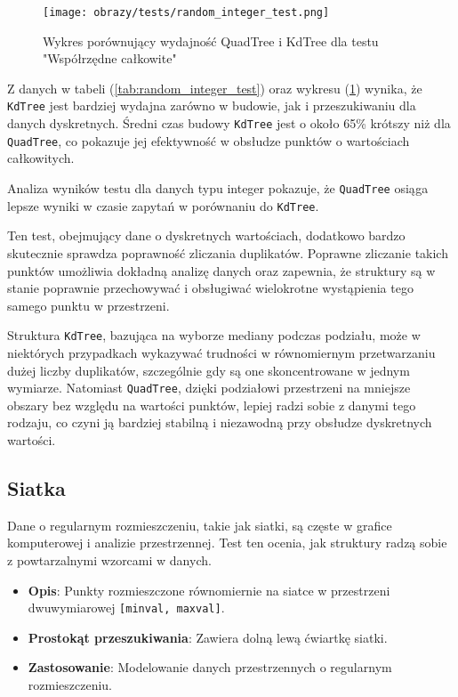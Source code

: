 \documentclass[12pt]{article}
\begin{document}
\begin{figure}[h]
    \centering
    \texttt{[image: obrazy/tests/random\_integer\_test.png]}
    \caption{Wykres porównujący wydajność QuadTree i KdTree dla testu "Współrzędne całkowite"}
    \label{fig:random_integer_tests}
\end{figure}

\newpage
\noindent Z danych w tabeli (\ref{tab:random_integer_test}) oraz wykresu (\ref{fig:random_integer_tests}) wynika, że \texttt{KdTree} jest bardziej wydajna zarówno w budowie, jak i przeszukiwaniu dla danych dyskretnych. Średni czas budowy \texttt{KdTree} jest o około 65\% krótszy niż dla \texttt{QuadTree}, co pokazuje jej efektywność w obsłudze punktów o wartościach całkowitych.

\noindent Analiza wyników testu dla danych typu integer pokazuje, że \texttt{QuadTree} osiąga lepsze wyniki w czasie zapytań w porównaniu do \texttt{KdTree}.

\noindent Ten test, obejmujący dane o dyskretnych wartościach, dodatkowo bardzo skutecznie sprawdza poprawność zliczania duplikatów. Poprawne zliczanie takich punktów umożliwia dokładną analizę danych oraz zapewnia, że struktury są w stanie poprawnie przechowywać i obsługiwać wielokrotne wystąpienia tego samego punktu w przestrzeni.

\noindent Struktura \texttt{KdTree}, bazująca na wyborze mediany podczas podziału, może w niektórych przypadkach wykazywać trudności w równomiernym przetwarzaniu dużej liczby duplikatów, szczególnie gdy są one skoncentrowane w jednym wymiarze. Natomiast \texttt{QuadTree}, dzięki podziałowi przestrzeni na mniejsze obszary bez względu na wartości punktów, lepiej radzi sobie z danymi tego rodzaju, co czyni ją bardziej stabilną i niezawodną przy obsłudze dyskretnych wartości.


\newpage
\subsection{Siatka}
Dane o regularnym rozmieszczeniu, takie jak siatki, są częste w grafice komputerowej i analizie przestrzennej. Test ten ocenia, jak struktury radzą sobie z powtarzalnymi wzorcami w danych.
\begin{itemize}
    \item \textbf{Opis}: Punkty rozmieszczone równomiernie na siatce w przestrzeni dwuwymiarowej \texttt{[minval, maxval]}.
    \item \textbf{Prostokąt przeszukiwania}: Zawiera dolną lewą ćwiartkę siatki.
    \item \textbf{Zastosowanie}: Modelowanie danych przestrzennych o regularnym rozmieszczeniu.
\end{itemize}
\end{document}
